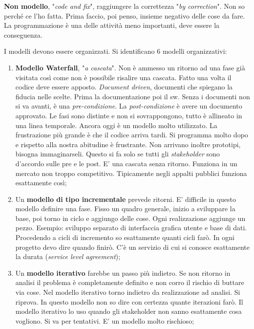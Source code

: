 \textbf{Non modello}, "\textit{code and fix}", raggiungere la correttezza "\textit{by correction}". Non so perché ce l'ho fatta. Prima faccio, poi penso, insieme negativo delle cose da fare. La programmazione è una delle attività meno importanti, deve essere la conseguenza.

I modelli devono essere organizzati. Si identificano 6 modelli organizzativi:

\begin{enumerate}

	\item \textbf{Modello Waterfall}, "\textit{a cascata}". Non è ammesso un ritorno ad una fase già visitata così come non è possibile risalire una cascata. Fatto una volta il codice deve essere apposto. \textit{Document driven}, documenti che spiegano la fiducia nelle scelte. Prima la documentazione poi il sw. Senza i documenti non si va avanti, è una \textit{pre-condizione}. La \textit{post-condizione} è avere un documento approvato. Le fasi sono distinte e non si sovrappongono, tutto è allineato in una linea temporale. Ancora oggi è un modello molto utilizzato. La frustrazione più grande è che il codice arriva tardi. Si programma molto dopo e rispetto alla nostra abitudine è frustrante. Non arrivano inoltre prototipi, bisogna immaginarseli. Questo si fa solo se tutti gli \textit{stakeholder} sono d'accordo sulle pre e le post. E' una cascata senza ritorno. Funziona in un mercato non troppo competitivo. Tipicamente negli appalti pubblici funziona esattamente così;
	
	\item Un \textbf{modello di tipo incrementale} prevede ritorni. E' difficile in questo modello definire una fase. Fisso un quadro generale, inizio a sviluppare la base, poi torno in ciclo e aggiungo delle cose. Ogni realizzazione aggiunge un pezzo. Esempio: sviluppo separato di interfaccia grafica utente e base di dati. Procedendo a cicli di incremento so esattamente quanti cicli farò. In ogni progetto devo dire quando finirò. C'è un servizio di cui si conosce esattamente la durata (\textit{service level agreement});
	
	\item Un \textbf{modello iterativo} farebbe un passo più indietro. Se non ritorno in analisi il problema è completamente definito e non corro il rischio di buttare via cose. Nel modello iterativo torno indietro da realizzazione ad analisi. Si riprova. In questo modello non so dire con certezza quante iterazioni farò. Il modello iterativo lo uso quando gli stakeholder non sanno esattamente cosa vogliono. Si va per tentativi. E' un modello molto rischioso;
	

\end{enumerate}
